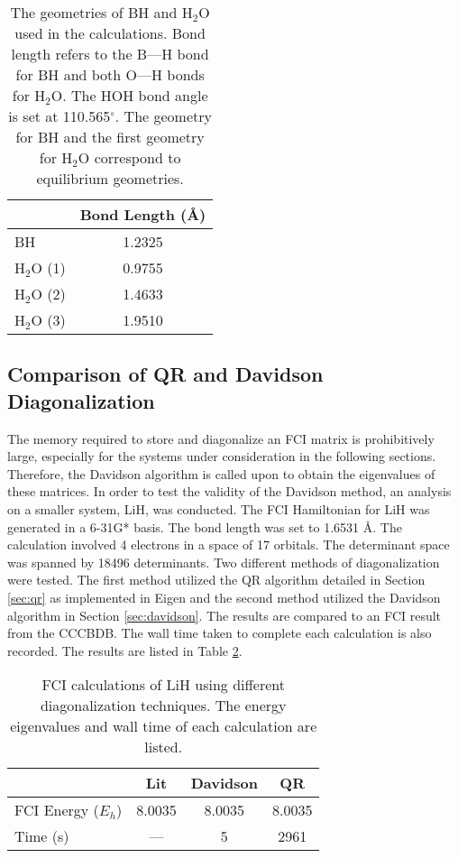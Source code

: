 \documentclass[final,3p,times,twocolumn]{elsarticle}
\begin{document}
\begin{table}
\centering
\begin{tabular}{l|c}
\hline\hline
& Bond Length (\AA) \\ \hline
BH & 1.2325 \\ \hline
H$_2$O (1) & 0.9755\\
H$_2$O (2) & 1.4633\\
H$_2$O (3) & 1.9510\\ \hline\hline
\end{tabular}
\caption{The geometries of BH and H$_2$O used in the calculations. Bond length refers to the B---H bond for BH and both O---H bonds for H$_2$O. The HOH bond angle is set at 110.565$^\circ$. The geometry for BH and the first geometry for H$_2$O correspond to equilibrium geometries.}
\label{tab:geo}
\end{table}


\subsection{Comparison of QR and Davidson Diagonalization}
The memory required to store and diagonalize an FCI matrix is prohibitively large, especially for the systems under consideration in the following sections. Therefore, the Davidson algorithm is called upon to obtain the eigenvalues of these matrices. In order to test the validity of the Davidson method, an analysis on a smaller system, LiH, was conducted. The FCI Hamiltonian for LiH was generated in a 6-31G* basis. The bond length was set to 1.6531 \AA. The calculation involved 4 electrons in a space of 17 orbitals. The determinant space was spanned by 18496 determinants. Two different methods of diagonalization were tested. The first method utilized the QR algorithm detailed in Section \ref{sec:qr} as implemented in Eigen\cite{eigen} and the second method utilized the Davidson algorithm in Section \ref{sec:davidson}. The results are compared to an FCI result from the CCCBDB.\cite{cccbdb} The wall time taken to complete each calculation is also recorded. The results are listed in Table \ref{tab:lihresults}.

\begin{table}
\centering
\begin{tabular}{l|ccc} \hline\hline
& Lit\cite{cccbdb} & Davidson & QR \\ \hline
FCI Energy ($E_h$) & 8.0035 & 8.0035 & 8.0035 \\
Time (s) & --- & 5 & 2961 \\ \hline\hline
\end{tabular}
\caption{FCI calculations of LiH using different diagonalization techniques. The energy eigenvalues and wall time of each calculation are listed.}
\label{tab:lihresults}
\end{table}
\end{document}
